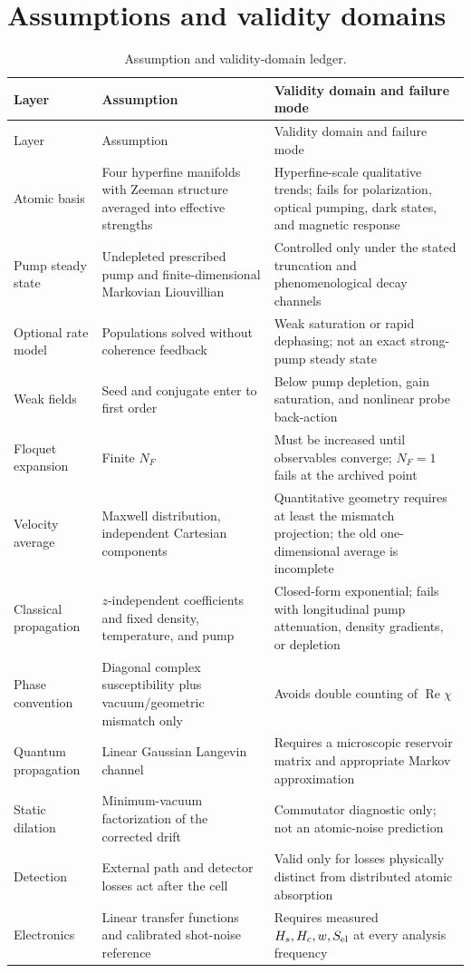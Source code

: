 \documentclass[11pt,a4paper]{article}
\newcommand{\Rea}{\operatorname{Re}}
\begin{document}
\appendix

\section{Assumptions and validity domains}
\label{app:assumptions}

\begin{longtable}{L{3.4cm}L{5.0cm}L{5.6cm}}
\caption{Assumption and validity-domain ledger.}
\label{tab:assumptions}\\
\toprule
Layer & Assumption & Validity domain and failure mode\\
\midrule
\endfirsthead
\toprule
Layer & Assumption & Validity domain and failure mode\\
\midrule
\endhead
Atomic basis & Four hyperfine manifolds with Zeeman structure averaged into
effective strengths & Hyperfine-scale qualitative trends; fails for
polarization, optical pumping, dark states, and magnetic response\\
Pump steady state & Undepleted prescribed pump and finite-dimensional
Markovian Liouvillian & Controlled only under the stated truncation and
phenomenological decay channels\\
Optional rate model & Populations solved without coherence feedback &
Weak saturation or rapid dephasing; not an exact strong-pump steady state\\
Weak fields & Seed and conjugate enter to first order & Below pump depletion,
gain saturation, and nonlinear probe back-action\\
Floquet expansion & Finite $N_F$ & Must be increased until observables
converge; $N_F=1$ fails at the archived point\\
Velocity average & Maxwell distribution, independent Cartesian components &
Quantitative geometry requires at least the mismatch projection; the old
one-dimensional average is incomplete\\
Classical propagation & $z$-independent coefficients and fixed density,
temperature, and pump & Closed-form exponential; fails with longitudinal
pump attenuation, density gradients, or depletion\\
Phase convention & Diagonal complex susceptibility plus vacuum/geometric
mismatch only & Avoids double counting of $\Rea\chi$\\
Quantum propagation & Linear Gaussian Langevin channel & Requires a
microscopic reservoir matrix and appropriate Markov approximation\\
Static dilation & Minimum-vacuum factorization of the corrected drift &
Commutator diagnostic only; not an atomic-noise prediction\\
Detection & External path and detector losses act after the cell &
Valid only for losses physically distinct from distributed atomic absorption\\
Electronics & Linear transfer functions and calibrated shot-noise reference &
Requires measured $H_s,H_c,w,S_{\rm el}$ at every analysis frequency\\
\bottomrule
\end{longtable}
\end{document}
